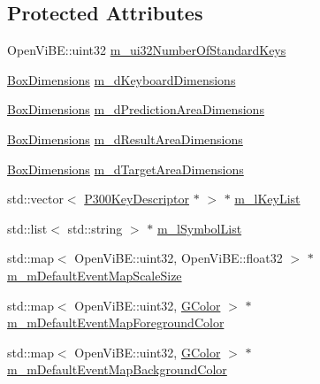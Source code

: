 \subsection*{Protected Attributes}
\begin{DoxyCompactItemize}
\item 
OpenViBE::uint32 \hyperlink{classOpenViBEApplications_1_1P300ScreenLayoutReader_a4b19abd34cc0f6601250c54e3568b199}{m\_\-ui32NumberOfStandardKeys}
\item 
\hyperlink{structOpenViBEApplications_1_1__BoxDimensions}{BoxDimensions} \hyperlink{classOpenViBEApplications_1_1P300ScreenLayoutReader_ac4d3bfee9e9922f9d5e015194141d7ae}{m\_\-dKeyboardDimensions}
\item 
\hyperlink{structOpenViBEApplications_1_1__BoxDimensions}{BoxDimensions} \hyperlink{classOpenViBEApplications_1_1P300ScreenLayoutReader_ab8324f6cffaad7252db746ab608690c2}{m\_\-dPredictionAreaDimensions}
\item 
\hyperlink{structOpenViBEApplications_1_1__BoxDimensions}{BoxDimensions} \hyperlink{classOpenViBEApplications_1_1P300ScreenLayoutReader_aea76fe8ecd3bda6d0dd1365110029065}{m\_\-dResultAreaDimensions}
\item 
\hyperlink{structOpenViBEApplications_1_1__BoxDimensions}{BoxDimensions} \hyperlink{classOpenViBEApplications_1_1P300ScreenLayoutReader_acd7e997bb2623b01241831928589ca7c}{m\_\-dTargetAreaDimensions}
\item 
std::vector$<$ \hyperlink{classOpenViBEApplications_1_1P300KeyDescriptor}{P300KeyDescriptor} $\ast$ $>$ $\ast$ \hyperlink{classOpenViBEApplications_1_1P300ScreenLayoutReader_ac97fdfda4e8e6aca27c6d039938949ef}{m\_\-lKeyList}
\item 
std::list$<$ std::string $>$ $\ast$ \hyperlink{classOpenViBEApplications_1_1P300ScreenLayoutReader_a373004186aac4d4600f3afeafbd5d570}{m\_\-lSymbolList}
\item 
std::map$<$ OpenViBE::uint32, OpenViBE::float32 $>$ $\ast$ \hyperlink{classOpenViBEApplications_1_1P300ScreenLayoutReader_a35ca3829364243d83c0768f53be3b725}{m\_\-mDefaultEventMapScaleSize}
\item 
std::map$<$ OpenViBE::uint32, \hyperlink{structOpenViBEApplications_1_1GColor}{GColor} $>$ $\ast$ \hyperlink{classOpenViBEApplications_1_1P300ScreenLayoutReader_a3e4e80fcbf42bc3c37f834852149c19a}{m\_\-mDefaultEventMapForegroundColor}
\item 
std::map$<$ OpenViBE::uint32, \hyperlink{structOpenViBEApplications_1_1GColor}{GColor} $>$ $\ast$ \hyperlink{classOpenViBEApplications_1_1P300ScreenLayoutReader_aa9457e6485c54a8646f7dcae8b487f11}{m\_\-mDefaultEventMapBackgroundColor}

\end{DoxyCompactItemize}
